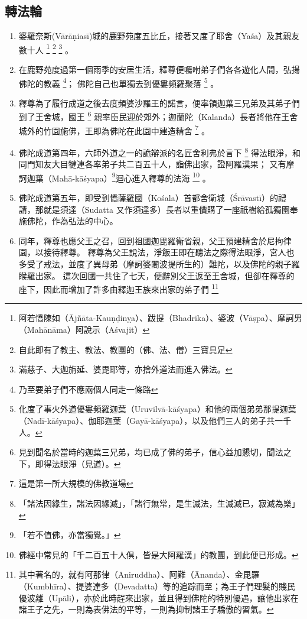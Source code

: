 \subsection{轉法輪}
\begin{enumerate}
  \item 婆羅奈斯(Vārāṇiasī)城的鹿野苑度五比丘，接著又度了耶舍（Yaśa）及其親友數十人
    \footnote{ 阿若憍陳如（Ājñāta-Kauṇḍinỵa）、跋提（Bhadrika）、婆波（Vāṣpa）、摩訶男（Mahānāma）阿說示（Aśvajit）}
    \footnote{自此即有了教主、教法、教團的（佛、法、僧）三寶具足}
    \footnote{滿慈子、大迦旃延、婆毘耶等，亦捨外道法而進入佛法。}
    。
  \item 在鹿野苑度過第一個雨季的安居生活，釋尊便囑咐弟子們各各遊化人間，弘揚佛陀的教義
    \footnote{乃至要弟子們不應兩個人同走一條路}；
    佛陀自己也單獨去到優婁頻羅聚落
    \footnote{化度了事火外道優婁頻羅迦葉（Uruvilvā-kāśyapa）和他的兩個弟弟那提迦葉（Nadī-kāśyapa）、伽耶迦葉（Gayā-kāśyapa），以及他們三人的弟子共一千人。}
    。
  \item 釋尊為了履行成道之後去度頻婆沙羅王的諾言，便率領迦葉三兄弟及其弟子們到了王舍城，國王
    \footnote{見到聞名於當時的迦葉三兄弟，均已成了佛的弟子，信心益加懇切，聞法之下，即得法眼淨（見道）。}
    親率臣民迎於郊外；迦蘭陀（Kalanda）長者將他在王舍城外的竹園施佛，王即為佛陀在此園中建造精舍
    \footnote{這是第一所大規模的佛教道場}
    。
  \item 佛陀成道第四年，六師外道之一的詭辯派的名匠舍利弗於言下
    \footnote{「諸法因緣生，諸法因緣滅」，「諸行無常，是生滅法，生滅滅已，寂滅為樂」}
    得法眼淨，和同門知友大目犍連各率弟子共二百五十人，詣佛出家，證阿羅漢果；
    又有摩訶迦葉（Mahā-kāśyapa）\footnote{「若不值佛，亦當獨覺。」}迴心進入釋尊的法海
    \footnote{佛經中常見的「千二百五十人俱，皆是大阿羅漢」的教團，到此便已形成。}
    。
  \item 佛陀成道第五年，即受到憍薩羅國（Kośala）首都舍衛城（Śrāvastī）的禮請，那就是須達（Sudatta 又作須達多）長者以重價購了一座祇樹給孤獨園奉施佛陀，作為弘法的中心。
  \item 同年，釋尊也應父王之召，回到祖國迦毘羅衛省親，父王預建精舍於尼拘律園，以接待釋尊。
    釋尊為父王說法，淨飯王即在聽法之際得法眼淨，宮人也多受了戒法，並度了異母弟（摩訶婆闍波提所生的）難陀，以及佛陀的親子羅睺羅出家。
    這次回國一共住了七天，便辭別父王返至王舍城，但卻在釋尊的座下，因此而增加了許多由釋迦王族來出家的弟子們
    \footnote{其中著名的，就有阿那律（Aniruddha）、阿難（Ānanda）、金毘羅（Kumbhīra）、提婆達多（Devadatta）等的追踪而至；為王子們理髮的賤民優波離（Upāli），亦於此時趕來出家，並且得到佛陀的特別優遇，讓他出家在諸王子之先，一則為表佛法的平等，一則為抑制諸王子驕傲的習氣。}

\end{enumerate}

